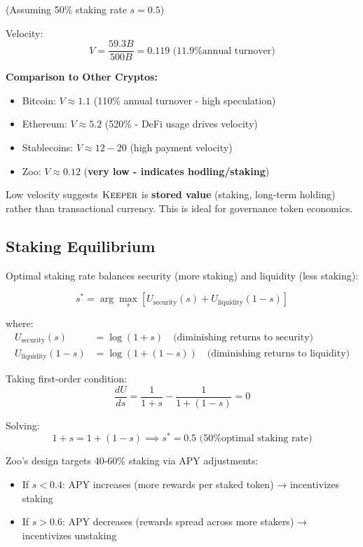 (Assuming 50\% staking rate $s = 0.5$)

Velocity:
\begin{equation}
V = \frac{59.3B}{500B} = 0.119 \text{ (11.9\% annual turnover)}
\end{equation}

\textbf{Comparison to Other Cryptos:}
\begin{itemize}
\item Bitcoin: $V \approx 1.1$ (110\% annual turnover - high speculation)
\item Ethereum: $V \approx 5.2$ (520\% - DeFi usage drives velocity)
\item Stablecoins: $V \approx 12-20$ (high payment velocity)
\item Zoo: $V \approx 0.12$ (\textbf{very low - indicates hodling/staking})
\end{itemize}

Low velocity suggests $\textsc{Keeper}$ is \textbf{stored value} (staking, long-term holding) rather than transactional currency. This is ideal for governance token economics.

\subsection{Staking Equilibrium}

Optimal staking rate balances security (more staking) and liquidity (less staking):

\begin{equation}
s^* = \arg\max_{s} \left[ U_{\text{security}}(s) + U_{\text{liquidity}}(1-s) \right]
\end{equation}

where:
\begin{align}
U_{\text{security}}(s) &= \log(1 + s) \quad \text{(diminishing returns to security)} \\
U_{\text{liquidity}}(1-s) &= \log(1 + (1-s)) \quad \text{(diminishing returns to liquidity)}
\end{align}

Taking first-order condition:
\begin{equation}
\frac{dU}{ds} = \frac{1}{1+s} - \frac{1}{1+(1-s)} = 0
\end{equation}

Solving:
\begin{equation}
1 + s = 1 + (1 - s) \implies s^* = 0.5 \text{ (50\% optimal staking rate)}
\end{equation}

Zoo's design targets 40-60\% staking via APY adjustments:
\begin{itemize}
\item If $s < 0.4$: APY increases (more rewards per staked token) → incentivizes staking
\item If $s > 0.6$: APY decreases (rewards spread across more stakers) → incentivizes unstaking
\end{itemize}

